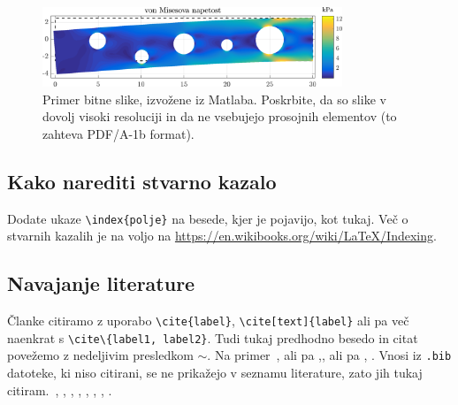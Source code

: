 \documentclass[isrm2, tisk]{fmfdelo}
\begin{document}
    \begin{figure}[h]
        \centering
        \includegraphics[width=0.8\textwidth]{images/image.png}
        \caption[Primer bitne slike.]{Primer bitne slike, izvožene iz Matlaba. Poskrbite, da so slike v
        dovolj visoki resoluciji in da ne vsebujejo prosojnih elementov (to zahteva PDF/A-1b format).}
        \label{fig:image}
    \end{figure}

    \subsection{Kako narediti stvarno kazalo}
    Dodate ukaze \verb|\index{polje}| na besede, kjer je pojavijo, kot tukaj.
    Več o stvarnih kazalih je na voljo na \url{https://en.wikibooks.org/wiki/LaTeX/Indexing}.

    \subsection{Navajanje literature}
    Članke citiramo z uporabo \verb|\cite{label}|, \verb|\cite[text]{label}| ali pa več naenkrat s
    \verb|\cite\{label1, label2}|. Tudi tukaj predhodno besedo in citat povežemo z nedeljivim presledkom
    $\sim$. Na primer~\cite{chen2006meshless,liu2001point}, ali pa \cite{kibriya2007empirical},\cite{kibriya2007empirical}, ali pa
    \cite[str.\ 12]{trobec2015parallel}, \cite[enačba (2.3)]{pereira2016convergence}.
    Vnosi iz \verb|.bib| datoteke, ki niso citirani, se ne prikažejo v seznamu literature, zato jih
    tukaj citiram.~\cite{vene2000categorical}, \cite{gregoric2017stopniceni}, \cite{slak2015induktivni},
    \cite{nsphere}, \cite{kearsley1975linearly}, \cite{STtemplate}, \cite{NunbergerTand}, \cite{vanoosten2008realizability}.
\end{document}
